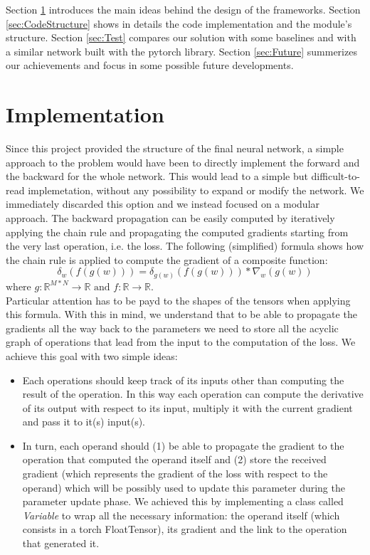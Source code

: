 \documentclass[10pt,conference,compsocconf]{IEEEtran}
\begin{document}
Section \ref{sec:Implementation} introduces the main ideas behind the design of the frameworks. Section \ref{sec:CodeStructure} shows in details the code implementation and the module's structure. Section \ref{sec:Test} compares our solution with some baselines and with a similar network built with the pytorch library. Section \ref{sec:Future} summerizes our achievements and focus in some possible future developments.
        
\section{Implementation}
\label{sec:Implementation}
Since this project provided the structure of the final neural network, a simple approach to the problem would have been to directly implement the forward and the backward for the whole network. This would lead to a simple but difficult-to-read implemetation, without any possibility to expand or modify the network. We immediately discarded this option and we instead focused on a modular approach.
The backward propagation can be easily computed by iteratively applying the chain rule and propagating the computed gradients starting from the very last operation, i.e. the loss. The following (simplified) formula shows how the chain rule is applied to compute the gradient of a composite function:
\[\delta_w(f(g(w))) = \delta_{g(w)}(f(g(w)))*\nabla_w(g(w))\]
$\mbox{where } g: \mathbb{R}^{M*N} \rightarrow \mathbb{R} \mbox{ and } f: \mathbb{R} \rightarrow \mathbb{R}. $ \\
Particular attention has to be payd to the shapes of the tensors when applying this formula. With this in mind, we understand that to be able to propagate the gradients all the way back to the parameters we need to store all the acyclic graph of operations that lead from the input to the computation of the loss. We achieve this goal with two simple ideas:
\begin{itemize}
    \item Each operations should keep track of its inputs other than computing the result of the operation. In this way each operation can compute the derivative of its output with respect to its input, multiply it with the current gradient and pass it to it(s) input(s).
    \item In turn, each operand should (1) be able to propagate the gradient to the operation that computed the operand itself and (2) store the received gradient (which represents the gradient of the loss with respect to the operand) which will be possibly used to update this parameter during the parameter update phase. We achieved this by implementing a class called \textit{Variable} to wrap all the necessary information: the operand itself (which consists in a torch FloatTensor), its gradient and the link to the operation that generated it.
\end{itemize}
\end{document}
